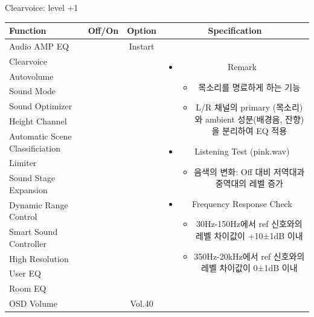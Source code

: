 \documentclass{beamer}
\begin{document}

\begin{frame}[t]{Clearvoice: level +1}
\begin{tiny}
\begin{tabular}{@{}lccc@{}}
\toprule
Function & Off/On & Option & Specification \\
\midrule
Audio AMP EQ & \color{black}{Off} & Instart &
\multirow{14}{60mm}{
\begin{itemize}
\item Remark
	\begin{itemize}
	\item 목소리를 명료하게 하는 기능
	\item L/R 채널의 primary (목소리)와 ambient 성분(배경음, 잔향)을 분리하여 EQ 적용
	\end{itemize}
\item Listening Test (pink.wav)
	\begin{itemize}
	\item 음색의 변화: Off 대비 저역대과 중역대의 레벨 증가
	\end{itemize}
\item Frequency Response Check
  \begin{itemize}
  \item 30Hz-150Hz에서 ref 신호와의 레벨 차이값이 +10±1dB 이내
  \item 350Hz-20kHz에서 ref 신호와의 레벨 차이값이 0±1dB 이내
  \end{itemize}
\end{itemize}
} \\
Clearvoice & \color{blue}{On} & \color{blue}{+1} & \\
Autovolume & \color{black}{Off} & & \\
Sound Mode & \color{black}{Off} & & \\
Sound Optimizer & \color{black}{Off} & & \\
Height Channel & \color{black}{Off} & & \\
Automatic Scene Classificiation & \color{black}{Off} & & \\
Limiter & \color{black}{Off} & & \\
Sound Stage Expansion & \color{black}{Off} & & \\
Dynamic Range Control & \color{black}{Off} & & \\
Smart Sound Controller & \color{black}{Off} & & \\
High Resolution & \color{black}{Off} & & \\
User EQ & \color{black}{Off} & & \\
Room EQ & \color{black}{Off} & & \\
OSD Volume & \color{blue}{On} & Vol.40 & \\
\midrule
\end{tabular}
\end{tiny}


\end{frame}
\end{document}
